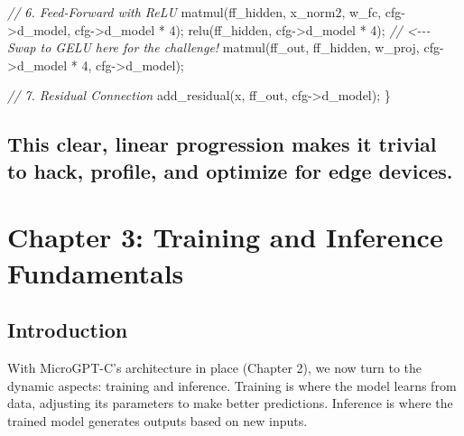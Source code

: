 \documentclass[
]{article}
\newenvironment{Shaded}{}{}
\newcommand{\CommentTok}[1]{\textcolor[rgb]{0.38,0.63,0.69}{\textit{#1}}}
\newcommand{\DecValTok}[1]{\textcolor[rgb]{0.25,0.63,0.44}{#1}}
\newcommand{\NormalTok}[1]{#1}
\newcommand{\OperatorTok}[1]{\textcolor[rgb]{0.40,0.40,0.40}{#1}}
\begin{document}
\begin{Shaded}
\begin{Highlighting}[]
    \CommentTok{// 6. Feed{-}Forward with ReLU}
\NormalTok{    matmul}\OperatorTok{(}\NormalTok{ff\_hidden}\OperatorTok{,}\NormalTok{ x\_norm2}\OperatorTok{,}\NormalTok{ w\_fc}\OperatorTok{,}\NormalTok{ cfg}\OperatorTok{{-}\textgreater{}}\NormalTok{d\_model}\OperatorTok{,}\NormalTok{ cfg}\OperatorTok{{-}\textgreater{}}\NormalTok{d\_model }\OperatorTok{*} \DecValTok{4}\OperatorTok{);}
\NormalTok{    relu}\OperatorTok{(}\NormalTok{ff\_hidden}\OperatorTok{,}\NormalTok{ cfg}\OperatorTok{{-}\textgreater{}}\NormalTok{d\_model }\OperatorTok{*} \DecValTok{4}\OperatorTok{);} \CommentTok{// \textless{}{-}{-}{-} Swap to GELU here for the challenge!}
\NormalTok{    matmul}\OperatorTok{(}\NormalTok{ff\_out}\OperatorTok{,}\NormalTok{ ff\_hidden}\OperatorTok{,}\NormalTok{ w\_proj}\OperatorTok{,}\NormalTok{ cfg}\OperatorTok{{-}\textgreater{}}\NormalTok{d\_model }\OperatorTok{*} \DecValTok{4}\OperatorTok{,}\NormalTok{ cfg}\OperatorTok{{-}\textgreater{}}\NormalTok{d\_model}\OperatorTok{);}
    
    \CommentTok{// 7. Residual Connection}
\NormalTok{    add\_residual}\OperatorTok{(}\NormalTok{x}\OperatorTok{,}\NormalTok{ ff\_out}\OperatorTok{,}\NormalTok{ cfg}\OperatorTok{{-}\textgreater{}}\NormalTok{d\_model}\OperatorTok{);}
\OperatorTok{\}}
\end{Highlighting}
\end{Shaded}

\subsection{This clear, linear progression makes it trivial to hack,
profile, and optimize for edge
devices.}\label{this-clear-linear-progression-makes-it-trivial-to-hack-profile-and-optimize-for-edge-devices.}

\section{Chapter 3: Training and Inference
Fundamentals}\label{chapter-3-training-and-inference-fundamentals}

\subsection{Introduction}\label{introduction-2}

With MicroGPT-C's architecture in place (Chapter 2), we now turn to the
dynamic aspects: training and inference. Training is where the model
learns from data, adjusting its parameters to make better predictions.
Inference is where the trained model generates outputs based on new
inputs.
\end{document}

